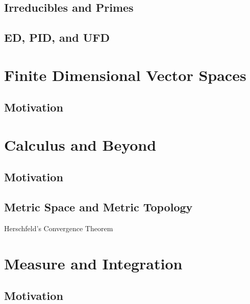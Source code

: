 \documentclass[11pt]{book}
\begin{document}
\section{Irreducibles and Primes}
\section{ED, PID, and UFD}
\chapter{Finite Dimensional Vector Spaces}
\section{Motivation}
\chapter{Calculus and Beyond}
\section{Motivation}
\newpage
\section{Metric Space and Metric Topology}
Herschfeld's Convergence Theorem
\chapter{Measure and Integration}
\section{Motivation}
\end{document}
